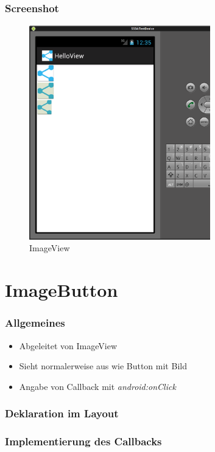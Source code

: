 \begin{frame}
   \frametitle{Screenshot}
	\begin{figure}[h!]
	  \centering
	  \includegraphics[width=0.7\textwidth]{pictures/imageview.ps}
	  \caption{
		  ImageView
	  }
	  \label{fig:imageview}
	\end{figure}
\end{frame}

\section{ImageButton}
\begin{frame}
   \frametitle{Allgemeines}
   \begin{itemize}
      \item Abgeleitet von ImageView
      \item Sieht normalerweise aus wie Button mit Bild
      \item Angabe von Callback mit \emph{android:onClick}
   \end{itemize}
\end{frame}

\begin{frame}
   \frametitle{Deklaration im Layout}
	
\end{frame}

\begin{frame}
   \frametitle{Implementierung des Callbacks}
	
\end{frame}

